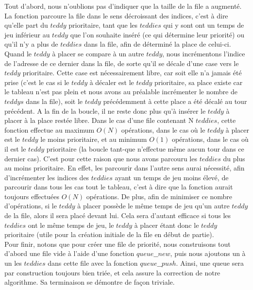 \documentclass{article}
\begin{document}
\begin{itemize}
    Tout d'abord, nous n'oublions pas d'indiquer que la taille de la file a augmenté. La fonction parcoure la file dans le sens décroissant des indices, c'est à dire qu'elle part du $teddy$ prioritaire, tant que les $teddies$ qui y sont ont un temps de jeu inférieur au $teddy$ que l'on souhaite inséré (ce qui détermine leur priorité) ou qu'il n'y a plus de $teddies$ dans la file, afin de déterminé la place de celui-ci. Quand le $teddy$ à placer se compare à un autre $teddy$, nous incrémentons l'indice de l'adresse de ce dernier dans la file, de sorte qu'il se décale d'une case vers le $teddy$ prioritaire. Cette case est nécessairement libre, car soit elle n'a jamais été prise (c'est le cas si le $teddy$ à décaler est le $teddy$ prioritaire, sa place existe car le tableau n'est pas plein et nous avons au préalable incrémenter le nombre de $teddys$ dans la file), soit le $teddy$ précédemment à cette place a été décalé au tour précédent. A la fin de la boucle, il ne reste donc plus qu'à insérer le $teddy$ à placer à la place restée libre. Dans le cas d'une file contenant N $teddies$, cette fonction effectue au maximum $O(N)$ opérations, dans le cas où le $teddy$ à placer est le $teddy$ le moins prioritaire, et au minimum $O(1)$ opérations, dans le cas où il est le $teddy$ prioritaire (la boucle tant-que n'effectue même aucun tour dans ce dernier cas). C'est pour cette raison que nous avons parcouru les $teddies$ du plus au moins prioritaire. En effet, les parcourir dans l'autre sens aurai nécessité, afin d'incrémenter les indices des $teddies$ ayant un temps de jeu moins élevé, de parcourir dans tous les cas tout le tableau, c'est à dire que la fonction aurait toujours effectuées $O(N)$ opérations.  De plus, afin de minimiser ce nombre d'opérations, si le $teddy$ à placer possède le même temps de jeu qu'un autre $teddy$ de la file, alors il sera placé devant lui. Cela sera d'autant efficace si tous les $teddies$ ont le même temps de jeu, le $teddy$ à placer étant donc le $teddy$ prioritaire (utile pour la création initiale de la file en début de partie).\\
    Pour finir, notons que pour créer une file de priorité, nous construisons tout d'abord une file vide à l'aide d'une fonction $queue\_\_new$, puis nous ajoutons un à un les $teddies$ dans cette file avec la fonction $queue\_\_push$. Ainsi, une queue sera par construction toujours bien triée, et cela assure la correction de notre algorithme. Sa terminaison se démontre de façon triviale.  \\ \\

\end{itemize}
\end{document}
